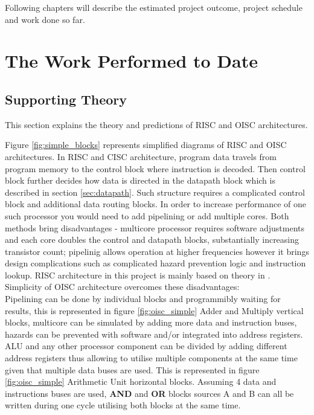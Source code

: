 \documentclass[a4paper,12pt]{article}
\begin{document}
\begin{multicols}{2}
Following chapters will describe the estimated project outcome, project schedule and work done so far.

\section{The Work Performed to Date}
\subsection{Supporting Theory} \label{sec:theory}
This section explains the theory and predictions of RISC and OISC architectures.

Figure \ref{fig:simple_blocks} represents simplified diagrams of RISC and OISC architectures. In RISC and CISC architecture, program data travels from program memory to the control block where instruction is decoded. Then control block further decides how data is directed in the datapath block which is described in section \ref{sec:datapath}. Such structure requires a complicated control block and additional data routing blocks. In order to increase performance of one such processor you would need to add pipelining or add multiple cores. Both methods bring disadvantages - multicore processor requires software adjustments and each core doubles the control and datapath blocks, substantially increasing transistor count; pipelinig allows operation at higher frequencies however it brings design complications such as complicated hazard prevention logic and instruction lookup. RISC architecture in this project is mainly based on theory in \autocite{harris_harris_2013}. Simplicity of OISC architecture overcomes these disadvantages:
\\
Pipelining can be done by individual blocks and programmibly waiting for results, this is represented in figure \ref{fig:oisc_simple} Adder and Multiply vertical blocks, multicore can be simulated by adding more data and instruction buses, hazards can be prevented with software and/or integrated into address registers.
\\ 
ALU and any other processor component can be divided by adding different address registers thus allowing to utilise multiple components at the same time given that multiple data buses are used. This is represented in figure \ref{fig:oisc_simple} Arithmetic Unit horizontal blocks. Assuming 4 data and instructions buses are used, \textbf{AND} and \textbf{OR} blocks sources A and B can all be written during one cycle utilising both blocks at the same time.
\\

\end{multicols}
\end{document}
